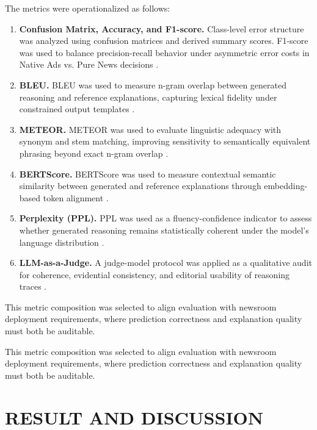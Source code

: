 \documentclass{ieeeaccess}
\begin{document}
The metrics were operationalized as follows:
\begin{enumerate}
    \item \textbf{Confusion Matrix, Accuracy, and F1-score.} Class-level error structure was analyzed using confusion matrices and derived summary scores. F1-score was used to balance precision-recall behavior under asymmetric error costs in Native Ads vs. Pure News decisions \cite{r34}.
    \item \textbf{BLEU.} BLEU was used to measure n-gram overlap between generated reasoning and reference explanations, capturing lexical fidelity under constrained output templates \cite{r35}.
    \item \textbf{METEOR.} METEOR was used to evaluate linguistic adequacy with synonym and stem matching, improving sensitivity to semantically equivalent phrasing beyond exact n-gram overlap \cite{r36}.
    \item \textbf{BERTScore.} BERTScore was used to measure contextual semantic similarity between generated and reference explanations through embedding-based token alignment \cite{r37}.
    \item \textbf{Perplexity (PPL).} PPL was used as a fluency-confidence indicator to assess whether generated reasoning remains statistically coherent under the model's language distribution \cite{r38}.
    \item \textbf{LLM-as-a-Judge.} A judge-model protocol was applied as a qualitative audit for coherence, evidential consistency, and editorial usability of reasoning traces \cite{r39}.
\end{enumerate}

This metric composition was selected to align evaluation with newsroom deployment requirements, where prediction correctness and explanation quality must both be auditable.

This metric composition was selected to align evaluation with newsroom deployment requirements, where prediction correctness and explanation quality must both be auditable.


\section{RESULT AND DISCUSSION}
\label{sec:results-discussion}
\end{document}
